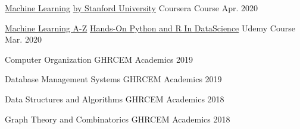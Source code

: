 

\begin{cvhonors}

  \cvhonor
    {\href{https://coursera.org/share/1d8cd1597ed41e5136d45576039f1ce1}{Machine Learning}} %
    {\href{https://coursera.org/share/1d8cd1597ed41e5136d45576039f1ce1}{by Stanford University}} %
    {Coursera Course} %
    {Apr. 2020} %

  \cvhonor
    {\href{https://www.udemy.com/certificate/UC-e0ab314e-8b5e-400a-8cb2-9341f9edc73a}{Machine Learning A-Z}}
    {\href{https://www.udemy.com/certificate/UC-e0ab314e-8b5e-400a-8cb2-9341f9edc73a/}{Hands-On Python and R In DataScience}} %
    {Udemy Course} %
    {Mar. 2020} %
    
\cvhonor
    {Computer Organization} %
    {GHRCEM} %
    {Academics} %
    {2019} %

\cvhonor
    {Database Management Systems} %
    {GHRCEM} %
    {Academics} %
    {2019} %

\cvhonor
    {Data Structures and Algorithms} %
    {GHRCEM} %
    {Academics} %
    {2018} %

\cvhonor
    {Graph Theory and Combinatorics} %
    {GHRCEM} %
    {Academics} %
    {2018} %

\end{cvhonors}
